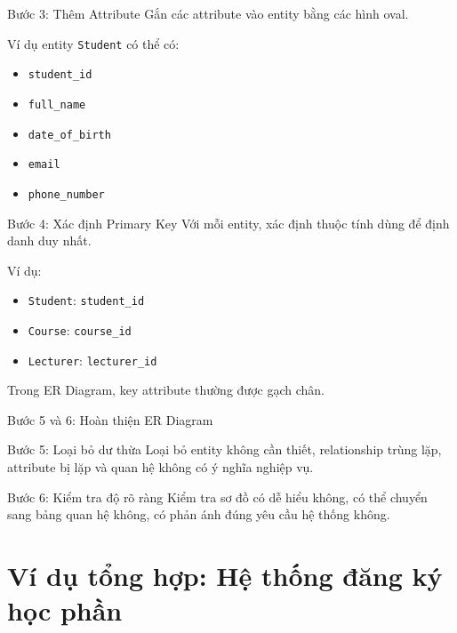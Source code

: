 \documentclass[aspectratio=169,11pt]{beamer}
\newcommand{\smallitem}{\setlength{\itemsep}{2pt}\setlength{\parskip}{0pt}}
\begin{document}
\begin{frame}{Bước 3: Thêm Attribute}
\small
Gắn các attribute vào entity bằng các hình oval.

\vspace{2mm}
Ví dụ entity \texttt{Student} có thể có:
\begin{itemize}
\smallitem
  \item \texttt{student\_id}
  \item \texttt{full\_name}
  \item \texttt{date\_of\_birth}
  \item \texttt{email}
  \item \texttt{phone\_number}
\end{itemize}
\end{frame}

\begin{frame}{Bước 4: Xác định Primary Key}
\small
Với mỗi entity, xác định thuộc tính dùng để định danh duy nhất.

\vspace{2mm}
Ví dụ:
\begin{itemize}
\smallitem
  \item \texttt{Student}: \texttt{student\_id}
  \item \texttt{Course}: \texttt{course\_id}
  \item \texttt{Lecturer}: \texttt{lecturer\_id}
\end{itemize}

Trong ER Diagram, key attribute thường được gạch chân.
\end{frame}

\begin{frame}{Bước 5 và 6: Hoàn thiện ER Diagram}
\small
\begin{block}{Bước 5: Loại bỏ dư thừa}
Loại bỏ entity không cần thiết, relationship trùng lặp, attribute bị lặp và quan hệ không có ý nghĩa nghiệp vụ.
\end{block}

\begin{block}{Bước 6: Kiểm tra độ rõ ràng}
Kiểm tra sơ đồ có dễ hiểu không, có thể chuyển sang bảng quan hệ không, có phản ánh đúng yêu cầu hệ thống không.
\end{block}
\end{frame}

\section{Ví dụ tổng hợp: Hệ thống đăng ký học phần}
\end{document}
